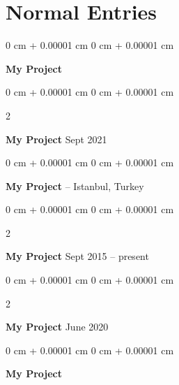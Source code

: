 \documentclass[10pt, letterpaper]{article}
\newenvironment{onecolentry}{
    \begin{adjustwidth}{
        0 cm + 0.00001 cm
    }{
        0 cm + 0.00001 cm
    }
}{
    \end{adjustwidth}
} %
\newenvironment{twocolentry}[2][]{
    \onecolentry
    \def\secondColumn{#2}
    \setcolumnwidth{\fill, 4.5 cm}
    \begin{paracol}{2}
}{
    \switchcolumn \raggedleft \secondColumn
    \end{paracol}
    \endonecolentry
} %
\begin{document}
    
    \section{Normal Entries}



        
        \begin{onecolentry}
            \textbf{My Project}\end{onecolentry}



        \vspace{0.2 cm}

        \begin{twocolentry}{
            Sept 2021
        }
            \textbf{My Project}\end{twocolentry}



        \vspace{0.2 cm}

        \begin{onecolentry}
            \textbf{My Project} -- Istanbul, Turkey\end{onecolentry}



        \vspace{0.2 cm}

        \begin{twocolentry}{
            Sept 2015 – present
        }
            \textbf{My Project}\end{twocolentry}



        \vspace{0.2 cm}

        \begin{twocolentry}{
            June 2020
        }
            \textbf{My Project}\end{twocolentry}



        \vspace{0.2 cm}

        \begin{onecolentry}
            \textbf{My Project}\end{onecolentry}
\end{document}
